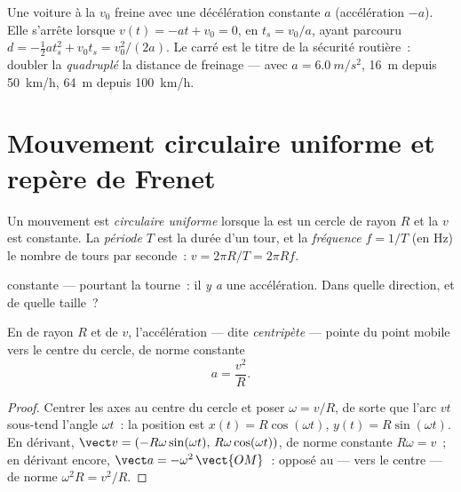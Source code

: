 \begin{example}\label{ex:g12:kinematics-2d:braking}
Une voiture à la  $v_0$ freine avec une décélération
constante $a$ (accélération $-a$). Elle s'arrête lorsque
$v(t) = -a t + v_0 = 0$, en $t_s = v_0/a$, ayant parcouru
$d = -\tfrac12 a t_s^2 + v_0 t_s = v_0^2/(2a)$. Le carré est le titre
de la sécurité routière~: doubler la  \emph{quadruplé}
la distance de freinage --- avec $a = \qty{6.0}{m/s^2}$, \qty{16}{m}
depuis \qty{50}{km/h}, \qty{64}{m} depuis \qty{100}{km/h}.
\end{example}

\section{Mouvement circulaire uniforme et repère de Frenet}

\begin{definition}\label{def:g12:kinematics-2d:ucm}
Un mouvement est \emph{circulaire uniforme} lorsque la  est un cercle de rayon
$R$ et la  $v$ est constante. La
\emph{période} $T$ est la durée d'un tour, et
la \emph{fréquence} $f = 1/T$ (en
\unit{Hz}) le nombre de tours par seconde~:
$v = 2\pi R/T = 2\pi R f$.
\end{definition}

 constante --- pourtant la  tourne~: il
\emph{y a} une accélération. Dans quelle direction, et de quelle
taille~?

\begin{theorem}\label{thm:g12:kinematics-2d:centripetal}
%
En  de rayon $R$ et de
 $v$, l'accélération --- dite \emph{centripète} ---
pointe du point mobile vers le centre du cercle, de norme constante
\[
a = \frac{v^2}{R}.
\]
\end{theorem}

\begin{proof}
Centrer les axes au centre du cercle et poser $\omega = v/R$, de sorte
que l'arc $v t$ sous-tend l'angle $\omega t$~: la position est
$x(t) = R\cos(\omega t)$, $y(t) = R\sin(\omega t)$. En dérivant,
$\vect v = (-R\omega\sin(\omega t),\, R\omega\cos(\omega t))$, de
norme constante $R\omega = v$~; en dérivant encore,
$\vect a = -\omega^2\,\vect{OM}$~: opposé au 
--- vers le centre --- de norme $\omega^2 R = v^2/R$.
\end{proof}

